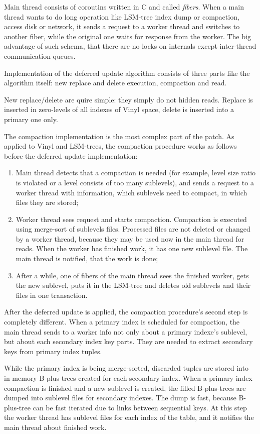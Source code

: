 \documentclass{vldb}
\begin{document}
Main thread consists of coroutins written in C and called \textit{fibers}. When
a main thread wants to do long operation like LSM-tree index dump or compaction,
access disk or network, it sends a request to a worker thread and switches to
another fiber, while the original one waits for response from the worker. The
big advantage of such schema, that there are no locks on internals except
inter-thread communication queues.

Implementation of the deferred update algorithm consists of three parts like the
algorithm itself: new replace and delete execution, compaction and read.

New replace/delete are quire simple: they simply do not hidden reads. Replace is
inserted in zero-levels of all indexes of Vinyl space, delete is inserted into a
primary one only.

The compaction implementation is the most complex part of the patch. As applied
to Vinyl and LSM-trees, the compaction procedure works as follows before the
deferred update implementation:
\begin{enumerate}
\item Main thread detects that a compaction is needed (for example, level size
ratio is violated or a level consists of too many sublevels), and sends a
request to a worker thread with information, which sublevels need to compact, in
which files they are stored;
\item Worker thread sees request and starts compaction. Compaction is executed
using merge-sort of sublevels files. Processed files are not deleted or changed
by a worker thread, because they may be used now in the main thread for reads.
When the worker has finished work, it has one new sublevel file. The main thread
is notified, that the work is done;
\item After a while, one of fibers of the main thread sees the finished worker,
gets the new sublevel, puts it in the LSM-tree and deletes old sublevels and
their files in one transaction.
\end{enumerate}

After the deferred update is applied, the compaction procedure's second step is
completely different. When a primary index is scheduled for compaction, the main
thread sends to a worker info not only about a primary indexe's sublevel, but
about each secondary index key parts. They are needed to extract secondary keys
from primary index tuples.

While the primary index is being merge-sorted, discarded tuples are stored into
in-memory B-plus-trees created for each secondary index. When a primary index
compaction is finished and a new sublevel is created, the filled B-plus-trees
are dumped into sublevel files for secondary indexes. The dump is fast, because
B-plus-tree can be fast iterated due to links between sequential keys. At this
step the worker thread has sublevel files for each index of the table, and it
notifies the main thread about finished work.
\end{document}
